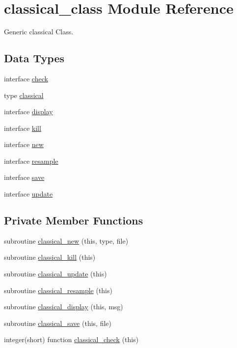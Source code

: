 \hypertarget{classclassical__class}{\section{classical\+\_\+class Module Reference}
\label{classclassical__class}
}


Generic classical Class.  


\subsection*{Data Types}
\begin{DoxyCompactItemize}
\item 
interface \hyperlink{interfaceclassical__class_1_1check}{check}
\item 
type \hyperlink{structclassical__class_1_1classical}{classical}
\item 
interface \hyperlink{interfaceclassical__class_1_1display}{display}
\item 
interface \hyperlink{interfaceclassical__class_1_1kill}{kill}
\item 
interface \hyperlink{interfaceclassical__class_1_1new}{new}
\item 
interface \hyperlink{interfaceclassical__class_1_1resample}{resample}
\item 
interface \hyperlink{interfaceclassical__class_1_1save}{save}
\item 
interface \hyperlink{interfaceclassical__class_1_1update}{update}
\end{DoxyCompactItemize}
\subsection*{Private Member Functions}
\begin{DoxyCompactItemize}
\item 
subroutine \hyperlink{classclassical__class_a6e5dda0e17a3e5cb552a289231d488fd}{classical\+\_\+new} (this, type, file)
\item 
subroutine \hyperlink{classclassical__class_a88946a9bda2bac6d08860b7d96cf5219}{classical\+\_\+kill} (this)
\item 
subroutine \hyperlink{classclassical__class_afb802bbd3f8834f449275a0bdab55677}{classical\+\_\+update} (this)
\item 
subroutine \hyperlink{classclassical__class_a9b5ff74fe77b1370f4ca34d3bb3783c9}{classical\+\_\+resample} (this)
\item 
subroutine \hyperlink{classclassical__class_ac2d45f3adc9cbe9dcf22b9905ba1f649}{classical\+\_\+display} (this, msg)
\item 
subroutine \hyperlink{classclassical__class_a961b68acb4e6f345ae596a8424866657}{classical\+\_\+save} (this, file)
\item 
integer(short) function \hyperlink{classclassical__class_ab91ea3d44c25f7d544b297e0b1a4f00a}{classical\+\_\+check} (this)
\end{DoxyCompactItemize}


